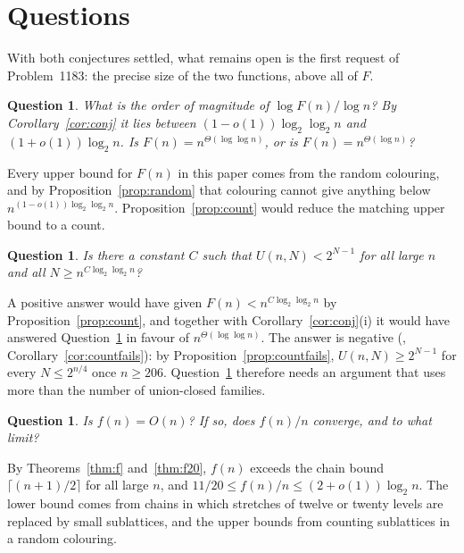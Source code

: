 \documentclass[11pt,reqno]{amsart}
\numberwithin{equation}{section}
\theoremstyle{plain}
\newtheorem{question}[theorem]{Question}
\theoremstyle{definition}
\theoremstyle{remark}
\begin{document}
\section{Questions}
\label{sec:questions}

With both conjectures settled, what remains open is the first request of
Problem~1183: the precise size of the two functions, above all of $F$.

\begin{question}
\label{q:F}
What is the order of magnitude of $\log F(n)/\log n$? By
Corollary~\ref{cor:conj} it lies between $(1-o(1))\log_2\log_2n$ and
$(1+o(1))\log_2n$. Is $F(n)=n^{\Theta(\log\log n)}$, or is
$F(n)=n^{\Theta(\log n)}$?
\end{question}

Every upper bound for $F(n)$ in this paper comes from the random
colouring, and by Proposition~\ref{prop:random} that colouring cannot
give anything below
$n^{(1-o(1))\log_2\log_2n}$. Proposition~\ref{prop:count} would reduce
the matching upper bound to a count.

\begin{question}
\label{q:count}
Is there a constant $C$ such that $U(n,N)<2^{N-1}$ for all large $n$ and
all $N\ge n^{C\log_2\log_2n}$?
\end{question}

A positive answer would have given $F(n)<n^{C\log_2\log_2n}$ by
Proposition~\ref{prop:count}, and together with
Corollary~\ref{cor:conj}(i) it would have answered Question~\ref{q:F} in
favour of $n^{\Theta(\log\log n)}$. The answer is negative
(\cite{Tr26}, Corollary~\ref{cor:countfails}): by Proposition~\ref{prop:countfails},
$U(n,N)\ge2^{N-1}$ for every $N\le2^{n/4}$ once $n\ge206$. Question~\ref{q:F}
therefore needs an argument that uses more than the number of
union-closed families.

\begin{question}
\label{q:f}
Is $f(n)=O(n)$? If so, does $f(n)/n$ converge, and to what limit?
\end{question}

By Theorems~\ref{thm:f} and~\ref{thm:f20}, $f(n)$ exceeds the chain
bound $\lceil(n+1)/2\rceil$ for all large $n$, and $11/20\le f(n)/n\le
(2+o(1))\log_2n$. The lower bound comes from chains in which stretches of
twelve or twenty levels are replaced by small sublattices, and the upper
bounds from counting sublattices in a random colouring.
\end{document}
